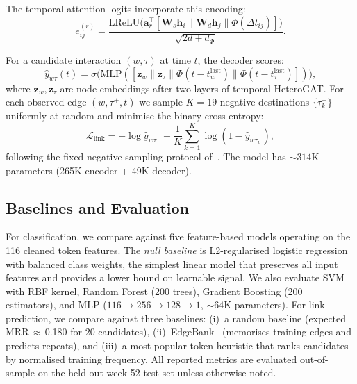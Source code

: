 \documentclass[10pt,journal]{IEEEtran}
\begin{document}
The temporal attention logits incorporate this encoding:
\begin{equation}
  e_{ij}^{(r)} = \frac{\mathrm{LReLU}\bigl(\mathbf{a}_r^\top
    [\mathbf{W}_s\mathbf{h}_i \| \mathbf{W}_d\mathbf{h}_j \|
    \Phi(\Delta t_{ij})]\bigr)}{\sqrt{2d+d_\Phi}}.
  \label{eq:temporal_attn}
\end{equation}

For a candidate interaction $(w,\tau)$ at time $t$, the decoder scores:
\begin{equation}
  \hat{y}_{w\tau}(t) = \sigma\!\bigl(\text{MLP}([\mathbf{z}_w \|
    \mathbf{z}_\tau \| \Phi(t{-}t_w^{\text{last}}) \|
    \Phi(t{-}t_\tau^{\text{last}})])\bigr),
  \label{eq:decoder}
\end{equation}
where $\mathbf{z}_w, \mathbf{z}_\tau$ are node embeddings after two
layers of temporal HeteroGAT. For each observed edge $(w,\tau^+,t)$ we
sample $K{=}19$ negative destinations $\{\tau_k^-\}$ uniformly at random
and minimise the binary cross-entropy:
\begin{equation}
  \mathcal{L}_{\text{link}} = -\log\hat{y}_{w\tau^+}
    - \frac{1}{K}\sum_{k=1}^{K}\log(1-\hat{y}_{w\tau_k^-}),
  \label{eq:link_loss}
\end{equation}
following the fixed negative sampling protocol
of~\cite{poursafaei2022edgebank}. The model has ${\sim}314$K parameters
(265K encoder + 49K decoder).

\subsection{Baselines and Evaluation}
\label{sec:baselines}

For classification, we compare against five feature-based models
operating on the 116 cleaned token features. The \emph{null baseline}
is L2-regularised logistic regression with balanced class weights, the
simplest linear model that preserves all input features and provides a
lower bound on learnable signal. We also evaluate SVM with RBF kernel,
Random Forest (200 trees), Gradient Boosting (200 estimators), and MLP
($116\to256\to128\to1$, ${\sim}64$K parameters). For link prediction,
we compare against three baselines: (i)~a random baseline (expected
MRR\,$\approx$\,0.180 for 20 candidates),
(ii)~EdgeBank~\cite{poursafaei2022edgebank} (memorises training edges
and predicts repeats), and (iii)~a most-popular-token heuristic that
ranks candidates by normalised training frequency. All reported metrics are
evaluated out-of-sample on the held-out week-52 test set unless
otherwise noted.
\end{document}
